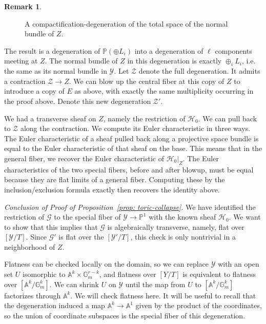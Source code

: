 \documentclass[11pt]{amsart}
\theoremstyle{definition}
\theoremstyle{definition}
\newtheorem{remark}[theorem]{Remark}
\newcommand{\cY}{\mathcal{Y}}
\newcommand{\cal}{\mathcal}
\def\cY{{\cal Y}}
\begin{document}
\begin{remark}
\begin{figure}[h!]
\caption{A compactification-degeneration of the total space of the normal bundle of $Z$.}\label{fig: degeneration-fan}
\end{figure}


The result is a degeneration of $\mathbb P(\oplus L_i)$ into a degeneration of $\ell$ components meeting at $Z$. The normal bundle of $Z$ in this degeneration is exactly $\oplus_i L_i$, i.e. the same as its normal bundle in $\cY$. Let $\mathcal Z$ denote the full degeneration. It admits a contraction $\mathcal Z\to Z$. We can blow up the central fiber at this copy of $Z$ to introduce a copy of $E$ as above, with exactly the same multiplicity occurring in the proof above. Denote this new degeneration $\mathcal Z'$. 

We had a transverse sheaf on $Z$, namely the restriction of $\mathcal H_0$. We can pull back to $\mathcal Z$ along the contraction. We compute its Euler characteristic in three ways. The Euler characteristic of a sheaf pulled back along a projective space bundle is equal to the Euler characteristic of that sheaf on the base. This means that in the general fiber, we recover the Euler characteristic of $\mathcal H_0|_{Z}$. The Euler characteristics of the two special fibers, before and after blowup, must be equal because they are flat limits of a general fiber. Computing these by the inclusion/exclusion formula exactly then recovers the identity above. 
\end{remark}

\noindent
{\it Conclusion of Proof of Proposition~\ref{prop: toric-collapse}}. We have identified the restriction of $\mathcal G$ to the special fiber of $\mathcal Y\to\mathbb P^1$ with the known sheaf $\mathcal H_0$. We want to show that this implies that $\mathcal G$ is algebraically transverse, namely, flat over $[\mathcal Y/T]$. Since $\mathcal G'$ is flat over the $[\cY'/T]$, this check is only nontrivial in a neighborhood of $Z$. 

Flatness can be checked locally on the domain, so we can replace $\cY$ with an open set $U$ isomorphic to $\mathbb A^k\times\mathbb G_m^{r-k}$, and flatness over $[Y/T]$ is equivalent to flatness over $[\mathbb A^k/\mathbb G_m^k]$. We can shrink $U$ on $\cY$ until the map from $U$ to $[\mathbb A^k/\mathbb G_m^k]$ factorizes through $\mathbb A^k$. We will check flatness here. It will be useful to recall that the degeneration induced a map $\mathbb A^k\to\mathbb A^1$ given by the product of the coordinates, so the union of coordinate subspaces is the special fiber of this degeneration. 
\end{document}
